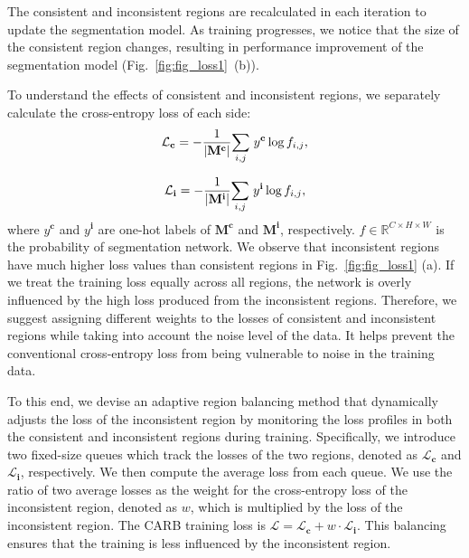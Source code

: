 \documentclass[letterpaper]{article} %
\begin{document}
The consistent and inconsistent regions are recalculated in each iteration to update the segmentation model. As training progresses, we notice that the size of the consistent region changes, resulting in performance improvement of the segmentation model (Fig.~\ref{fig:fig_loss1}~(b)).

To understand the effects of consistent and inconsistent regions, we separately calculate the cross-entropy loss of each side:
\begin{equation}
\label{eq_loss_con}
{\small
\mathcal{L}_\mathbf{c} = - \frac{1}{|\mathbf{M}^\mathbf{c}|} \underset{i,j}{\sum} \text{ } y^\mathbf{c} \log {f_{i,j}},
}
\end{equation}

\begin{equation}
\label{eq_loss_inc}
{\small
\mathcal{L}_\mathbf{i} = - \frac{1}{|\mathbf{M}^\mathbf{i}|} \underset{i,j}{\sum} \text{ } y^\mathbf{i} \log {f_{i,j}},
}
\end{equation}%
%
where $y^\mathbf{c}$ and $y^\mathbf{i}$ are one-hot labels of  $\mathbf{M}^\mathbf{c}$ and $\mathbf{M}^\mathbf{i}$, respectively. $f \in \mathbb{R}^{C \times H \times W}$ is the probability of segmentation network. We observe that inconsistent regions have much higher loss values than consistent regions in Fig.~\ref{fig:fig_loss1} (a). If we treat the training loss equally across all regions, the network is overly influenced by the high loss produced from the inconsistent regions. Therefore, we suggest assigning different weights to the losses of consistent and inconsistent regions while taking into account the noise level of the data. It helps prevent the conventional cross-entropy loss from being vulnerable to noise in the training data.

To this end, we devise an adaptive region balancing method that dynamically adjusts the loss of the inconsistent region by monitoring the loss profiles in both the consistent and inconsistent regions during training. Specifically, we introduce two fixed-size queues which track the losses of the two regions, denoted as $\mathcal{L}_\mathbf{c}$ and $\mathcal{L}_\mathbf{i}$, respectively. We then compute the average loss from each queue. We use the ratio of two average losses as the weight for the cross-entropy loss of the inconsistent region, denoted as $w$, which is multiplied by the loss of the inconsistent region. The CARB training loss is $\mathcal{L} = \mathcal{L}_\mathbf{c} + w \cdot \mathcal{L}_\mathbf{i}$. This balancing ensures that the training is less influenced by the inconsistent region.
\end{document}
